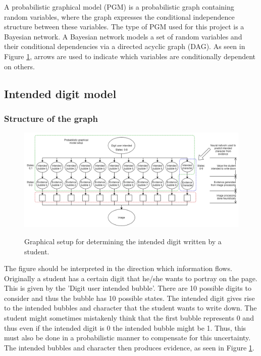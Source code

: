 A probabilistic graphical model (PGM) is a probabilistic graph containing random variables, where the graph expresses the conditional independence structure between these variables. The type of PGM used for this project is a Bayesian network. A Bayesian network models a set of random variables and their conditional dependencies via a directed acyclic graph (DAG). As seen in Figure \ref{fig:pgmDigit}, arrows are used to indicate which variables are conditionally dependent on others. 

\subsection{Intended digit model}

\subsubsection{Structure of the graph}


\begin{figure}
  \centering
  \includegraphics[width=16cm]{pgmDigit}\\
  \caption{Graphical setup for determining the intended digit written by a student.}
  \label{fig:pgmDigit}
\end{figure}


The figure should be interpreted in the direction which information flows. Originally a student has a certain digit that he/she wants to portray on the page. This is given by the 'Digit user intended bubble'. There are 10 possible digits to consider and thus the bubble has 10 possible states. The intended digit gives rise to the intended bubbles and character that the student wants to write down. The student might sometimes mistakenly think that the first bubble represents 0 and thus even if the intended digit is 0 the intended bubble might be 1. Thus, this must also be done in a probabilistic manner to compensate for this uncertainty. The intended bubbles and character then produces evidence, as seen in Figure \ref{fig:pgmDigit}.  

